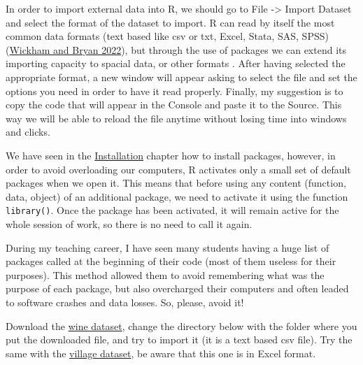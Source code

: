 \documentclass[
]{article}
\newenvironment{Shaded}{\begin{snugshade}}{\end{snugshade}}
\newcommand{\CommentTok}[1]{\textcolor[rgb]{0.56,0.35,0.01}{\textit{#1}}}
\newcommand{\FunctionTok}[1]{\textcolor[rgb]{0.13,0.29,0.53}{\textbf{#1}}}
\newcommand{\NormalTok}[1]{#1}
\newcommand{\OtherTok}[1]{\textcolor[rgb]{0.56,0.35,0.01}{#1}}
\newcommand{\SpecialCharTok}[1]{\textcolor[rgb]{0.81,0.36,0.00}{\textbf{#1}}}
\newcommand{\StringTok}[1]{\textcolor[rgb]{0.31,0.60,0.02}{#1}}
\begin{document}
In order to import external data into R, we should go to File -\textgreater{} Import
Dataset and select the format of the dataset to import. R can read by
itself the most common data formats (text based like csv or txt, Excel,
Stata, SAS, SPSS)(\protect\hyperlink{ref-wickham2022}{Wickham and Bryan 2022}), but through the use of packages we can
extend its importing capacity to spacial data, or other formats . After
having selected the appropriate format, a new window will appear asking
to select the file and set the options you need in order to have it read
properly. Finally, my suggestion is to copy the code that will appear in
the Console and paste it to the Source. This way we will be able to
reload the file anytime without losing time into windows and clicks.

We have seen in the \protect\hyperlink{installation}{Installation} chapter how to install packages,
however, in order to avoid overloading our computers, R activates only a
small set of default packages when we open it. This means that before
using any content (function, data, object) of an additional package, we
need to activate it using the function \texttt{library()}. Once the package has
been activated, it will remain active for the whole session of work, so
there is no need to call it again.

During my teaching career, I have seen many students having a huge list
of packages called at the beginning of their code (most of them useless
for their purposes). This method allowed them to avoid remembering what
was the purpose of each package, but also overcharged their computers
and often leaded to software crashes and data losses. So, please, avoid
it!

Download the \href{http://www.federicoroscioli.com/wp-content/uploads/2021/02/Wine.csv}{wine dataset}, change the directory below with the folder where you put the downloaded
file, and try to import it (it is a text based csv file). Try the same with the \href{http://www.federicoroscioli.com/wp-content/uploads/2022/03/Village.xlsx}{village dataset}, be aware that this one is in Excel format.

\begin{Shaded}
\end{Shaded}
\end{document}
